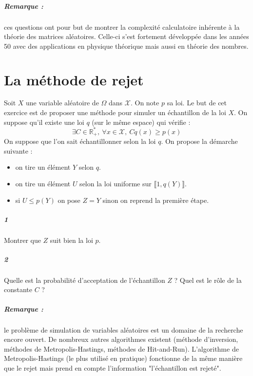 \documentclass[10pt,a4paper]{article}
\begin{document}
\subparagraph{Remarque :} ces questions ont pour but de montrer la complexité calculatoire inhérente à la théorie des matrices aléatoires. Celle-ci s'est fortement développée dans les années 50 avec des applications en physique théorique mais aussi en théorie des nombres. 

\section{La méthode de rejet}
Soit $X$ une variable aléatoire de $\Omega$ dans $\mathcal{X}$. On note $p$ sa loi.
Le but de cet exercice est de proposer une méthode pour simuler un échantillon de la loi $X$. On suppose qu'il existe une loi $q$ (sur le même espace) qui vérifie :
\begin{equation*}
\exists C \in \mathbb{R}_+^*, \ \forall x \in \mathcal{X}, \ Cq(x) \ge p(x)
\end{equation*}
On suppose que l'on sait échantillonner selon la loi $q$.
On propose la démarche suivante :
\begin{itemize}
\item on tire un élément $Y$ selon $q$.
\item on tire un élément $U$ selon la loi uniforme sur $\llbracket 1, q(Y) \rrbracket$.
\item si $U \le p(Y)$ on pose $Z=Y$ sinon on reprend la première étape.
\end{itemize}
\subparagraph{1}Montrer que $Z$ suit bien la loi $p$.
\subparagraph{2}Quelle est la probabilité d'acceptation de l'échantillon $Z$ ? Quel est le rôle de la constante $C$ ?
\subparagraph{Remarque :} le problème de simulation de variables aléatoires est un domaine de la recherche encore ouvert. De nombreux autres algorithmes existent (méthode d'inversion, méthodes de Metropolis-Hastings, méthodes de Hit-and-Run). L'algorithme de Metropolis-Hastings (le plus utilisé en pratique) fonctionne de la même manière que le rejet mais prend en compte l'information "l'échantillon est rejeté".
\end{document}
